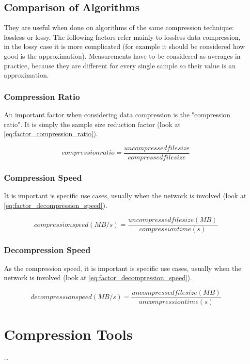 \documentclass[12pt, a4paper]{report}
\begin{document}
\section{Comparison of Algorithms}

They are useful when done on algorithms of the same compression technique: lossless or lossy.
The following factors refer mainly to lossless data compression, in the lossy case it is more complicated (for example it should
be considered how good is the approximation).
Measurements have to be considered as averages in practice, because they are different for every single sample so their value is
an approximation.

\subsection{Compression Ratio}

An important factor when considering data compression is the "compression ratio". It is simply the sample size reduction factor
(look at \autoref{eq:factor_compression_ratio}).

\begin{equation} \label{eq:factor_compression_ratio}
  compression ratio = \frac{uncompressed file size}{compressed file size}
\end{equation}

\subsection{Compression Speed}

It is important is specific use cases, usually when the network is involved (look at \autoref{eq:factor_decompression_speed}).

\begin{equation} \label{eq:factor_compression_speed}
  compression speed (MB / s) = \frac{uncompressed file size (MB)}{compression time (s)}
\end{equation}

\subsection{Decompression Speed}

As the compression speed, it is important is specific use cases, usually when the network is involved (look at
\autoref{eq:factor_decompression_speed}).

\begin{equation} \label{eq:factor_decompression_speed}
  decompression speed (MB / s) = \frac{uncompressed file size (MB)}{uncompression time (s)}
\end{equation}

\chapter{Compression Tools}

\dots

\appendix

\printbibliography
\end{document}
